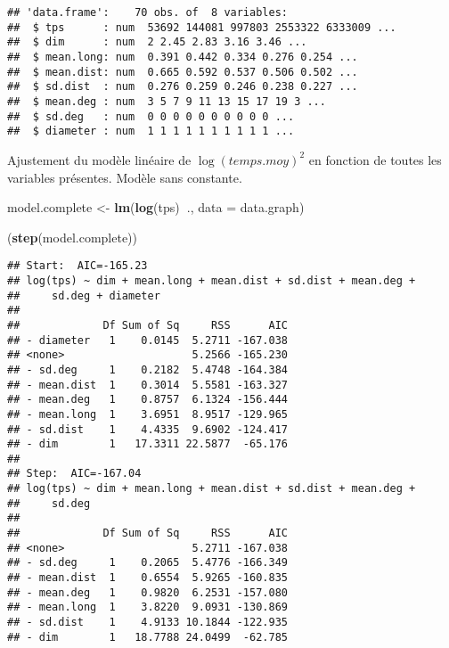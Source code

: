 \documentclass[]{article}
\newenvironment{Shaded}{\begin{snugshade}}{\end{snugshade}}
\newcommand{\DataTypeTok}[1]{\textcolor[rgb]{0.13,0.29,0.53}{#1}}
\newcommand{\KeywordTok}[1]{\textcolor[rgb]{0.13,0.29,0.53}{\textbf{#1}}}
\newcommand{\NormalTok}[1]{#1}
\newcommand{\OperatorTok}[1]{\textcolor[rgb]{0.81,0.36,0.00}{\textbf{#1}}}
\newcommand{\StringTok}[1]{\textcolor[rgb]{0.31,0.60,0.02}{#1}}
\begin{document}
\begin{verbatim}
## 'data.frame':    70 obs. of  8 variables:
##  $ tps      : num  53692 144081 997803 2553322 6333009 ...
##  $ dim      : num  2 2.45 2.83 3.16 3.46 ...
##  $ mean.long: num  0.391 0.442 0.334 0.276 0.254 ...
##  $ mean.dist: num  0.665 0.592 0.537 0.506 0.502 ...
##  $ sd.dist  : num  0.276 0.259 0.246 0.238 0.227 ...
##  $ mean.deg : num  3 5 7 9 11 13 15 17 19 3 ...
##  $ sd.deg   : num  0 0 0 0 0 0 0 0 0 0 ...
##  $ diameter : num  1 1 1 1 1 1 1 1 1 1 ...
\end{verbatim}

Ajustement du modèle linéaire de \(\log(temps.moy)^2\) en fonction de
toutes les variables présentes. Modèle sans constante.

\begin{Shaded}
\begin{Highlighting}[]
\NormalTok{model.complete <-}\StringTok{ }\KeywordTok{lm}\NormalTok{(}\KeywordTok{log}\NormalTok{(tps)}\OperatorTok{~}\NormalTok{., }\DataTypeTok{data =}\NormalTok{ data.graph)}
\end{Highlighting}
\end{Shaded}

\begin{Shaded}
\begin{Highlighting}[]
\NormalTok{(}\KeywordTok{step}\NormalTok{(model.complete))}
\end{Highlighting}
\end{Shaded}

\begin{verbatim}
## Start:  AIC=-165.23
## log(tps) ~ dim + mean.long + mean.dist + sd.dist + mean.deg + 
##     sd.deg + diameter
## 
##             Df Sum of Sq     RSS      AIC
## - diameter   1    0.0145  5.2711 -167.038
## <none>                    5.2566 -165.230
## - sd.deg     1    0.2182  5.4748 -164.384
## - mean.dist  1    0.3014  5.5581 -163.327
## - mean.deg   1    0.8757  6.1324 -156.444
## - mean.long  1    3.6951  8.9517 -129.965
## - sd.dist    1    4.4335  9.6902 -124.417
## - dim        1   17.3311 22.5877  -65.176
## 
## Step:  AIC=-167.04
## log(tps) ~ dim + mean.long + mean.dist + sd.dist + mean.deg + 
##     sd.deg
## 
##             Df Sum of Sq     RSS      AIC
## <none>                    5.2711 -167.038
## - sd.deg     1    0.2065  5.4776 -166.349
## - mean.dist  1    0.6554  5.9265 -160.835
## - mean.deg   1    0.9820  6.2531 -157.080
## - mean.long  1    3.8220  9.0931 -130.869
## - sd.dist    1    4.9133 10.1844 -122.935
## - dim        1   18.7788 24.0499  -62.785
\end{verbatim}
\end{document}
